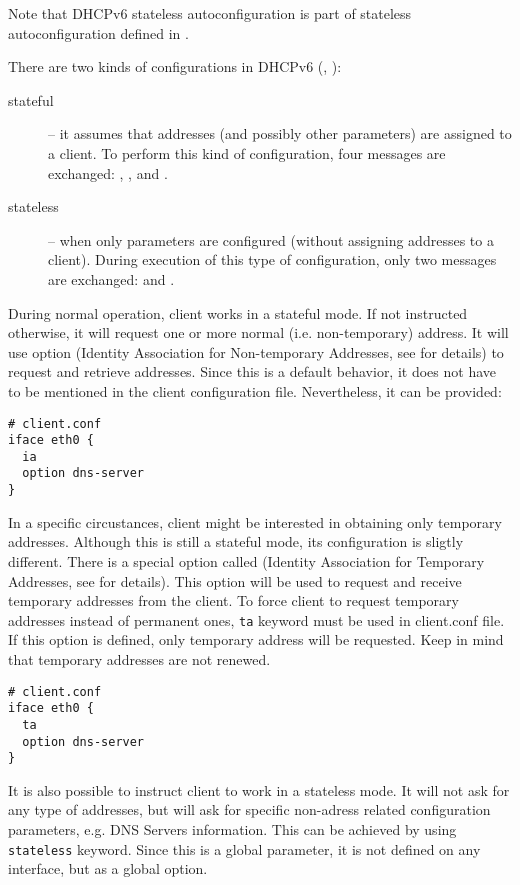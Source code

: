 Note that DHCPv6 stateless autoconfiguration is part of stateless autoconfiguration
defined in \cite{rfc4862}.

There are two kinds of configurations in DHCPv6 (\cite{rfc3315},
\cite{rfc3736}):
\begin{description}
  \item[stateful] -- it assumes that addresses (and possibly other
    parameters) are assigned to a client. To perform this kind of
    configuration, four messages are exchanged: ,
    ,  and .
  \item[stateless] -- when only parameters are configured (without
    assigning addresses to a client). During execution of this type of
    configuration, only two messages are exchanged: 
    and .
\end{description}

During normal operation, client works in a stateful mode. If not
instructed otherwise, it will request one or more normal
(i.e. non-temporary) address. It will use  option (Identity
Association for Non-temporary Addresses, see \cite{rfc3315} for
details) to request and retrieve addresses. Since this is a default
behavior, it does not have to be mentioned in the client configuration
file. Nevertheless, it can be provided:

\begin{lstlisting}
# client.conf
iface eth0 {
  ia
  option dns-server
}
\end{lstlisting}

In a specific circustances, client might be interested in obtaining
only temporary addresses. Although this is still a stateful mode, its
configuration is sligtly different. There is a special option called
 (Identity Association for Temporary Addresses, see
\cite{rfc3315} for details). This option will be used to request and
receive temporary addresses from the client. To force client to
request temporary addresses instead of permanent ones, \verb+ta+
keyword must be used in client.conf file. If this option is defined,
only temporary address will be requested. Keep in mind that temporary
addresses are not renewed.

\begin{lstlisting}
# client.conf
iface eth0 {
  ta
  option dns-server
}
\end{lstlisting}

It is also possible to instruct client to work in a stateless mode. It
will not ask for any type of addresses, but will ask for specific
non-adress related configuration parameters, e.g. DNS Servers
information. This can be achieved by using \verb+stateless+
keyword. Since this is a global parameter, it is not defined on any
interface, but as a global option.

